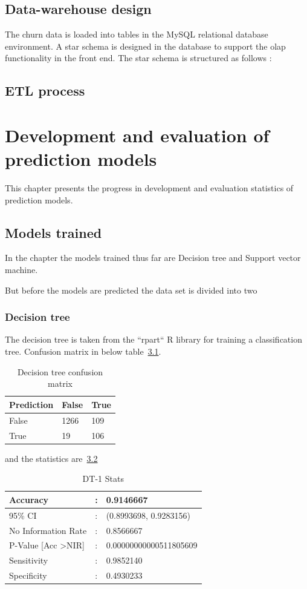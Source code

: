 \section{Data-warehouse design}
The churn data is loaded into tables in the MySQL relational database environment. A star schema is designed in the database to support the olap functionality in the front end. The star schema is structured as follows :



\section{ETL process}


\chapter{Development and evaluation of prediction models}
\label{ch:depm}
This chapter presents the progress in development and evaluation statistics of prediction models.

\section{Models trained}

In the chapter the models trained thus far are Decision tree and Support vector machine.

But before the models are predicted the data set is divided into two 

\subsection{Decision tree}
The decision tree is taken from the ``rpart`` R library for training a classification tree. 
Confusion matrix in below table~\ref{dt-cm}.
	\begin{table}[H]
		\centering
		\caption{Decision tree confusion matrix}
		\label{dt-cm}
		\begin{tabular}{lll}
			\hline
			Prediction & False & True \\
			\hline
			False & 1266 & 109 \\
			\hline
			True & 19 & 106 \\
			\hline
		\end{tabular}
	\end{table}
and the statistics are~\ref{dt-1-stats}
	\begin{table}[H]
		\centering
		\caption{DT-1 Stats}
		\label{dt-1-stats}
		\begin{tabular}{p{5cm}p{1cm}p{5cm}}
			Accuracy  & : & 0.9146667 \\
			\hline
			95\% CI   & : & (0.8993698, 0.9283156) \\ \hline
			No Information Rate  & : & 0.8566667 \\ \hline
			P-Value {[}Acc \textgreater NIR{]}  & : & 0.00000000000511805609 \\ \hline
			Sensitivity  & : & 0.9852140 \\ \hline
			Specificity  & : & 0.4930233 \\ \hline
			
		\end{tabular}
	\end{table}
	
